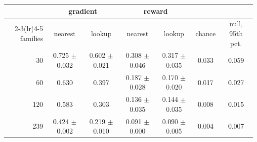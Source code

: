 \begin{tabular}{rcccccc}\toprule
 & \multicolumn{2}{c}{gradient} & \multicolumn{2}{c}{reward} & & \\ \cmidrule(lr){2-3}\cmidrule(lr){4-5}
families & nearest & lookup & nearest & lookup & chance & null, 95th pct. \\ \midrule
30 & 0.725 $\pm$ 0.032 & 0.602 $\pm$ 0.021 & 0.308 $\pm$ 0.046 & 0.317 $\pm$ 0.035 & 0.033 & 0.059 \\
60 & 0.630 & 0.397 & 0.187 $\pm$ 0.028 & 0.170 $\pm$ 0.020 & 0.017 & 0.027 \\
120 & 0.583 & 0.303 & 0.136 $\pm$ 0.035 & 0.144 $\pm$ 0.035 & 0.008 & 0.015 \\
239 & 0.424 $\pm$ 0.002 & 0.219 $\pm$ 0.010 & 0.091 $\pm$ 0.000 & 0.090 $\pm$ 0.005 & 0.004 & 0.007 \\
\bottomrule
\end{tabular}
